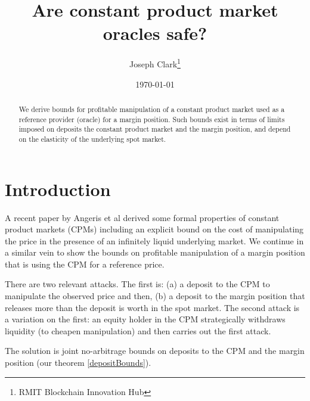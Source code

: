 \documentclass[12pt]{article}
\begin{document}
\begin{titlepage}
\title{Are constant product market oracles safe?}
\author{Joseph Clark\thanks{RMIT Blockchain Innovation Hub} }
\date{\today}
\maketitle
\begin{abstract}
\noindent We derive bounds for profitable manipulation of a constant product market used as a reference provider (oracle) for a margin position. Such bounds exist in terms of limits imposed on deposits the constant product market and the margin position, and depend on the elasticity of the underlying spot market.

\bigskip
\end{abstract}
\setcounter{page}{0}
\thispagestyle{empty}
\end{titlepage}
\pagebreak \newpage




\doublespacing


\section{Introduction} \label{sec:introduction}

A recent paper by Angeris et al \cite{ang20} derived some formal properties of constant product markets (CPMs) including an explicit bound on the cost of manipulating the price in the presence of an infinitely liquid underlying market. We continue in a similar vein to show the bounds on profitable manipulation of a margin position that is using the CPM for a reference price.  

There are two relevant attacks. The first is: (a) a deposit to the CPM to manipulate the observed price and then, (b) a deposit to the margin position that releases more than the deposit is worth in the spot market. The second attack is a variation on the first: an equity holder in the CPM strategically withdraws liquidity (to cheapen manipulation) and then carries out the first attack.

The solution is joint no-arbitrage bounds on deposits to the CPM and the margin position (our theorem \ref{depositBounds}).
\end{document}
